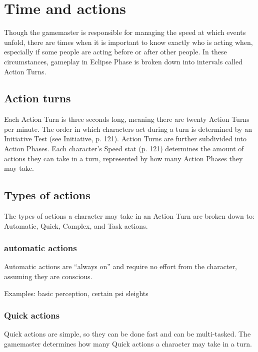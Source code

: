 \section{Time and actions}
\label{sec:time-actions}

Though the gamemaster is responsible for managing the speed at which
events unfold, there are times when it is important to know exactly
who is acting when, especially if some people are acting before or
after other people. In these circumstances, gameplay in Eclipse Phase
is broken down into intervals called Action Turns.

\subsection{Action turns}
\label{sec:action-turns}

Each Action Turn is three seconds long, meaning there are twenty
Action Turns per minute. The order in which characters act during a
turn is determined by an Initiative Test (see Initiative,
p. 121). Action Turns are further subdivided into Action Phases. Each
character's Speed stat (p. 121) determines the amount of actions they
can take in a turn, represented by how many Action Phases they may
take.

\subsection{Types of actions}
\label{sec:types-actions}

The types of actions a character may take in an Action Turn are broken
down to: Automatic, Quick, Complex, and Task actions.

\subsubsection{automatic actions}
\label{sec:automatic-actions}

Automatic actions are “always on” and require no effort from the
character, assuming they are conscious.

Examples: basic perception, certain psi sleights

\subsubsection{Quick actions}
\label{sec:quick-actions}

Quick actions are simple, so they can be done fast and can be
multi-tasked. The gamemaster determines how many Quick actions a
character may take in a turn.

